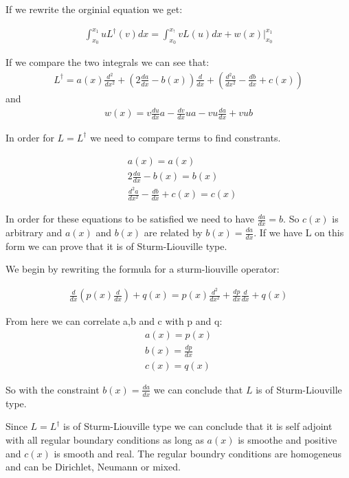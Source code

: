 \documentclass[a4paper]{article}
\begin{document}
If we rewrite the orginial equation we get:

\begin{align*}
    \int_{x_0}^{x_1} uL^\dagger(v) dx = \int_{x_0}^{x_!} v L(u) dx + w(x) \bigg\rvert_{x_0}^{x_1}
\end{align*}

If we compare the two integrals we can see that:
\begin{align*}
    L^\dagger = a(x)\frac{d^2}{dx^2} + \left(2\frac{da}{dx} - b(x)\right)\frac{d}{dx} + \left(\frac{d^2 a}{dx^2} - \frac{db}{dx} + c(x)\right)
\end{align*}
and
\begin{align*}
    w(x) = v\frac{du}{dx}a - \frac{dv}{dx}ua - vu \frac{da}{dx} + vub
\end{align*}

In order for $L = L^\dagger$ we need to compare terms to find constrants.

\begin{align*}
    &a(x) = a(x) \\
    &2\frac{da}{dx} - b(x) = b(x) \\
    &\frac{d^2 a}{dx^2} - \frac{db}{dx} + c(x) = c(x)
\end{align*}

In order for these equations to be satisfied we need to have $\frac{da}{dx} = b$. So $c(x)$ is arbitrary and $a(x)$ and $b(x)$ are related by $b(x) = \frac{da}{dx}$. If we have L on this form we can prove that it is of Sturm-Liouville type.

We begin by rewriting the formula for a sturm-liouville operator:

\begin{align*}
    \frac{d}{dx}\left( p(x) \frac{d}{dx} \right) + q(x) = p(x) \frac{d^2}{dx^2} + \frac{dp}{dx} \frac{d}{dx} + q(x)
\end{align*}

From here we can correlate a,b and c with p and q:
\begin{align*}
    a(x) = p(x) \\
    b(x) = \frac{dp}{dx} \\
    c(x) = q(x)
\end{align*}

So with the constraint $b(x) = \frac{da}{dx}$ we can conclude that $L$ is of Sturm-Liouville type.

Since $L = L^\dagger$ is of Sturm-Liouville type we can conclude that it is self adjoint with all regular boundary conditions as long as $a(x)$ is smoothe and positive and $c(x)$ is smooth and real. The regular boundry conditions are homogeneus and can be Dirichlet, Neumann or mixed.
\end{document}
